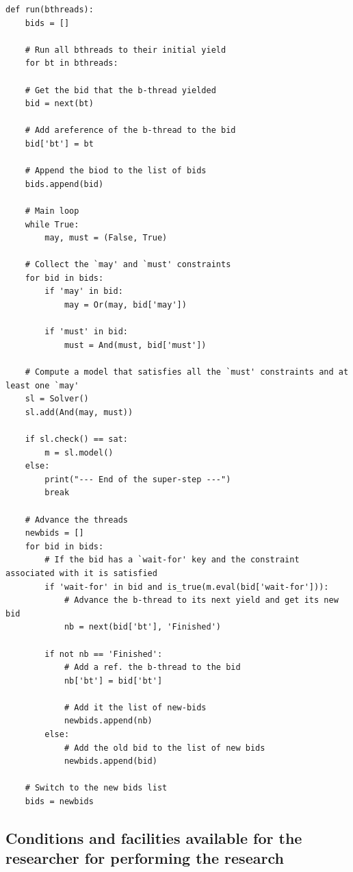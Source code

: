 \documentclass[11pt]{article}
\begin{document}
\begin{lstlisting}[label={code:execution},caption={An execution mechanism that runs a set of b-threads, each specified as a Python generator that yields a list of dictionaries with `may', `must', and `wait-for' constraints.},captionpos=b,frame = single]
def run(bthreads):
    bids = []
    
    # Run all bthreads to their initial yield
    for bt in bthreads:
   
    # Get the bid that the b-thread yielded
    bid = next(bt)
    
    # Add areference of the b-thread to the bid
    bid['bt'] = bt
    
    # Append the biod to the list of bids
    bids.append(bid)
    
    # Main loop
    while True:
        may, must = (False, True)
    
    # Collect the `may' and `must' constraints
    for bid in bids:
        if 'may' in bid:
            may = Or(may, bid['may'])
    
        if 'must' in bid:
            must = And(must, bid['must'])
    
    # Compute a model that satisfies all the `must' constraints and at least one `may' 
    sl = Solver()
    sl.add(And(may, must))
    
    if sl.check() == sat:
        m = sl.model()
    else:
        print("--- End of the super-step ---")
        break
    
    # Advance the threads
    newbids = []
    for bid in bids:
        # If the bid has a `wait-for' key and the constraint associated with it is satisfied
        if 'wait-for' in bid and is_true(m.eval(bid['wait-for'])):
            # Advance the b-thread to its next yield and get its new bid
            nb = next(bid['bt'], 'Finished')
            
        if not nb == 'Finished':
            # Add a ref. the b-thread to the bid
            nb['bt'] = bid['bt']
            
            # Add it the list of new-bids
            newbids.append(nb)
        else:
            # Add the old bid to the list of new bids
            newbids.append(bid)
    
    # Switch to the new bids list
    bids = newbids
\end{lstlisting}



\subsection{Conditions and facilities available for the researcher for performing the research}
\end{document}
